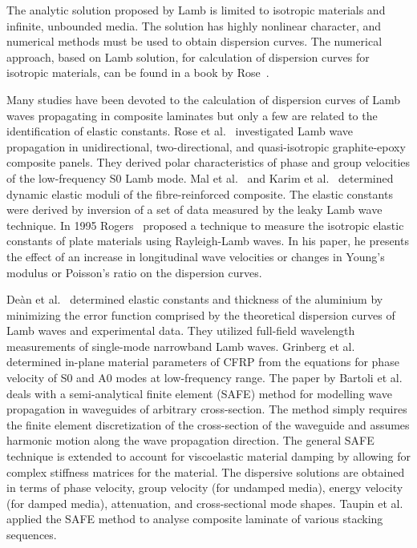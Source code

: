 \documentclass[preprint,12pt]{elsarticle}
\begin{document}
	The analytic solution proposed by Lamb is limited to isotropic materials and infinite, unbounded media. The solution has highly nonlinear character, and numerical methods must be used to obtain dispersion curves. The numerical approach, based on Lamb solution, for calculation of dispersion curves for isotropic materials, can be found in a book by Rose~\cite{Rose1999}.

	Many studies have been devoted to the calculation of dispersion curves of Lamb waves propagating in composite laminates but only a few are related to the identification of elastic constants. Rose et al.~\cite{Rose1987} investigated Lamb wave propagation in unidirectional, two-directional, and quasi-isotropic graphite-epoxy composite panels. They derived polar characteristics of phase and group velocities of the low-frequency S0 Lamb mode. Mal et al.~\cite{Mal1993} and Karim et al.~\cite{Karim1990} determined dynamic elastic moduli of the fibre-reinforced composite. The elastic constants were derived by inversion of a set of data measured by the leaky Lamb wave technique. In 1995 Rogers~\cite{Rogers1995} proposed a technique to measure the isotropic elastic constants of plate materials using Rayleigh-Lamb waves. In his paper, he presents the effect of an increase in longitudinal wave velocities or changes in Young’s modulus or Poisson’s ratio on the dispersion curves.

	De\`an et al.~\cite{Dean2008} determined elastic constants and thickness of the aluminium by minimizing the error function comprised by the theoretical dispersion curves of Lamb waves and experimental data. They utilized full-field wavelength measurements of single-mode narrowband Lamb waves. Grinberg et al.~\cite{Grimberg2010} determined in-plane material parameters of CFRP from the equations for phase velocity of S0 and A0 modes at low-frequency range. 
	The paper by Bartoli et al.~\cite{Bartoli2006} deals with a semi-analytical finite element (SAFE) method for modelling wave propagation in waveguides of arbitrary cross-section. The method simply requires the finite element discretization of the cross-section of the waveguide and assumes harmonic motion along the wave propagation direction. The general SAFE technique is extended to account for viscoelastic material damping by allowing for complex stiffness matrices for the material. The dispersive solutions are obtained in terms of phase velocity, group velocity (for undamped media), energy velocity (for damped media), attenuation, and cross-sectional mode shapes. Taupin et al.~\cite{Taupin2011} applied the SAFE method to analyse composite laminate of various stacking sequences.
\end{document}
